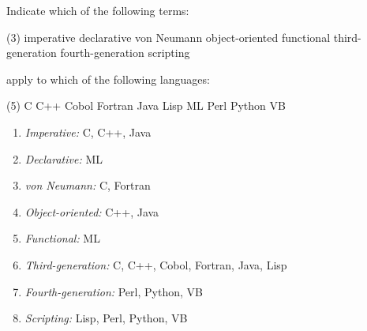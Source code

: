 \begin{exercise}\label{ex:010301}
    Indicate which of the following terms:
    \begin{tasks}(3)
        \task imperative
        \task declarative
        \task von Neumann
        \task object-oriented
        \task functional
        \task third-generation
        \task fourth-generation
        \task scripting
    \end{tasks}
    apply to which of the following languages:
    \begin{tasks}[label=\arabic*), ,label-width=1.5em](5)
        \task C 
        \task C++ 
        \task Cobol
        \task Fortran
        \task Java
        \task Lisp
        \task ML 
        \task Perl 
        \task Python 
        \task VB
    \end{tasks}
\end{exercise}
\begin{solution}\label{sol:010301}
    \begin{enumerate}[label=\alph*)]
        \item \textit{Imperative:} C, C++, Java
        \item \textit{Declarative:} ML
        \item \textit{von Neumann:} C, Fortran
        \item \textit{Object-oriented:} C++, Java
        \item \textit{Functional:} ML 
        \item \textit{Third-generation:} C, C++, Cobol, Fortran, Java, Lisp 
        \item \textit{Fourth-generation:} Perl, Python, VB
        \item \textit{Scripting:} Lisp, Perl, Python, VB
    \end{enumerate}
\end{solution}